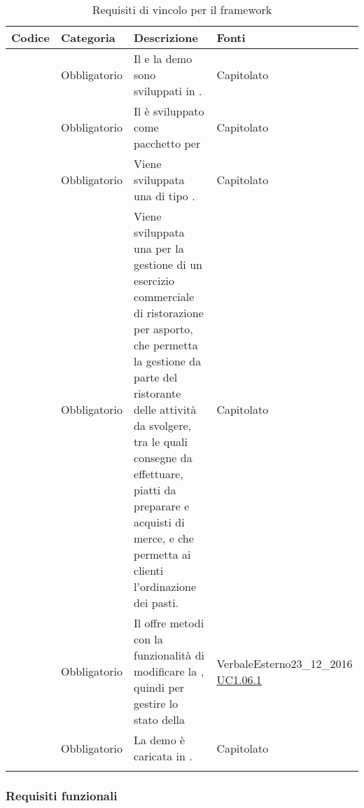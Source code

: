 \begin{longtable}{|P{1.5cm}|P{2.5cm}|P{6.5cm}|P{2.5cm}|}
	\hline \textbf{Codice} & \textbf{Categoria} & \textbf{Descrizione} & \textbf{Fonti} \\
	\hline \RequisitoObV\label{L1} & Obbligatorio & Il  e la demo sono sviluppati in . & Capitolato \\
	\hline \RequisitoObV \label{L2} & Obbligatorio & Il  è sviluppato come pacchetto per  & Capitolato \\
	\hline \RequisitoObV\label{L3} & Obbligatorio & Viene sviluppata una  di tipo . & Capitolato \\
	\hline \RequisitoObV\label{L4} & Obbligatorio & Viene sviluppata una  per la gestione di un esercizio commerciale di ristorazione per asporto, che permetta la gestione da parte del ristorante delle attività da svolgere, tra le quali consegne da effettuare, piatti da preparare e acquisti di merce, e che permetta ai clienti l'ordinazione dei pasti. & Capitolato \\
	\hline \RequisitoObV\label{L5} & Obbligatorio & Il  offre metodi con la funzionalità di modificare la , quindi per gestire lo stato della  & VerbaleEsterno23\_12\_2016 \linebreak \hyperref[UC1.06.1]{UC1.06.1}  \\
	\hline \RequisitoObV\label{L54} & Obbligatorio & La demo è caricata in . & Capitolato \\
	\hline
	\caption{Requisiti di vincolo per il framework}
\end{longtable}

\subsubsection{Requisiti funzionali}

